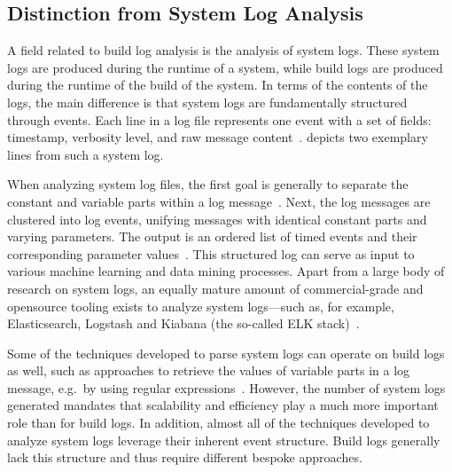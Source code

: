 \subsection{Distinction from System Log Analysis}
\label{sec:system-log-analysis}

A field related to build log analysis is the analysis of system logs.
These system logs are produced during the runtime of a system, while
build logs are produced during the runtime of the build of the system.
In terms of the contents of the logs, the main difference is that system
logs are fundamentally structured
through events.
Each line in a log file represents one event with a
set of fields: timestamp, verbosity level, and raw message
content~\cite{he2017towards}.
 depicts two
exemplary lines from such a system log.

When analyzing system log files, the first goal is generally to
separate the constant and variable parts within a log
message~\cite{nagappan2010abstracting,he2017towards}.
Next, the log
messages are clustered into log events, unifying messages with
identical constant parts and varying parameters.
The output is an
ordered list of timed events and their corresponding parameter
values~\cite{he2016evaluation}.
This structured log can serve as
input to various machine learning and data mining processes.
Apart
from a large body of research on system logs, an equally mature amount
of commercial-grade and
opensource tooling exists to analyze system logs---such as, for
example, Elasticsearch, Logstash and Kiabana (the so-called ELK
stack)~\cite{sanjappa2017analysis,bajer2017building}.

Some of the techniques developed to parse system logs can operate
on build logs as well, such as approaches to retrieve the
values of variable parts in a log message, e.g.\, by using regular
expressions~\cite{nagappan2010abstracting,xu2009detecting}.
However, the number of
system logs generated mandates that scalability and efficiency play a
much more important role than for build logs.
In addition, almost all of the techniques developed to analyze system logs
leverage their inherent event structure.
Build logs generally lack this
structure and thus require different bespoke approaches.


